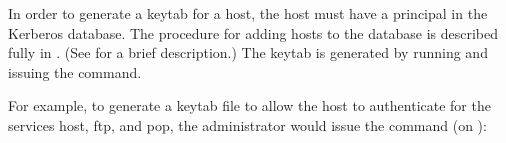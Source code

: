 \documentclass[letterpaper,10pt,english]{sphinxmanual}
\begin{document}
In order to generate a keytab for a host, the host must have a
principal in the Kerberos database.  The procedure for adding hosts to
the database is described fully in {\hyperref[\detokenize{admin/database:principals}]{}}.  (See
{\hyperref[\detokenize{admin/install_kdc:replica-host-key}]{}} for a brief description.)  The keytab is
generated by running {\hyperref[\detokenize{admin/admin_commands/kadmin_local:kadmin-1}]{}} and issuing the {\hyperref[\detokenize{admin/admin_commands/kadmin_local:ktadd}]{}}
command.

For example, to generate a keytab file to allow the host
 to authenticate for the services host, ftp, and
pop, the administrator  would issue the command (on
):
\end{document}
